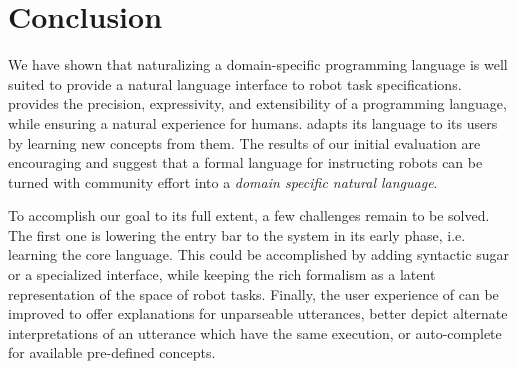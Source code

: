 \section{Conclusion}

We have shown that naturalizing a domain-specific programming language is well suited
to provide a natural language interface to robot task specifications.
\tool provides the precision, expressivity, and extensibility of a programming
language, while ensuring a natural experience for humans.
\tool adapts its language to its users by learning new concepts from them. 
The results of our initial evaluation are encouraging and suggest
that a formal language for instructing robots can be turned with community
effort into a \emph{domain specific natural language}.

To accomplish our goal to its full extent, a few challenges remain to be solved.
The first one is lowering the entry bar to the system in its early phase, i.e.
learning the core language.
This could be accomplished by adding syntactic sugar or a specialized interface,
while keeping the rich formalism as a latent representation of
the space of robot tasks.
Finally, the user experience of \tool can be improved to offer explanations for
unparseable utterances, better depict alternate interpretations of an utterance
which have the same execution, or auto-complete for available pre-defined concepts.
